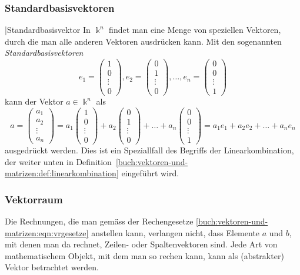 \subsubsection{Standardbasisvektoren}
\index|{Standardbasisvektor}%
In $\Bbbk^n$ findet man eine Menge von speziellen Vektoren, durch die
man alle anderen Vektoren ausdrücken kann.
Mit den sogenannten {\em Standardbasisvektoren}
\[
e_1=\begin{pmatrix}1\\0\\\vdots\\0\end{pmatrix},
e_2=\begin{pmatrix}0\\1\\\vdots\\0\end{pmatrix},
\dots,
e_n=\begin{pmatrix}0\\0\\\vdots\\1\end{pmatrix}
\]
kann der Vektor $a\in\Bbbk^n$ als
\[
a
=
\begin{pmatrix}a_1\\a_2\\\vdots\\a_n\end{pmatrix}
=
a_1 \begin{pmatrix}1\\0\\\vdots\\0\end{pmatrix}
+
a_2 \begin{pmatrix}0\\1\\\vdots\\0\end{pmatrix}
+
\dots
+
a_n \begin{pmatrix}0\\0\\\vdots\\1\end{pmatrix}
=
a_1e_1+a_2e_2+\dots+a_ne_n
\]
ausgedrückt werden.
Dies ist ein Speziallfall des Begriffs der Linearkombination, der
weiter unten in
Definition~\ref{buch:vektoren-und-matrizen:def:linearkombination}
eingeführt wird.

\subsubsection{Vektorraum}
Die Rechnungen, die man gemäss der Rechengesetze
\eqref{buch:vektoren-und-matrizen:eqn:vrgesetze}
anstellen kann, verlangen nicht, dass Elemente $a$ und $b$, mit denen man
da rechnet, Zeilen- oder Spaltenvektoren sind.
Jede Art von mathematischem Objekt, mit dem man so rechen kann,
kann als (abstrakter) Vektor betrachtet werden.

